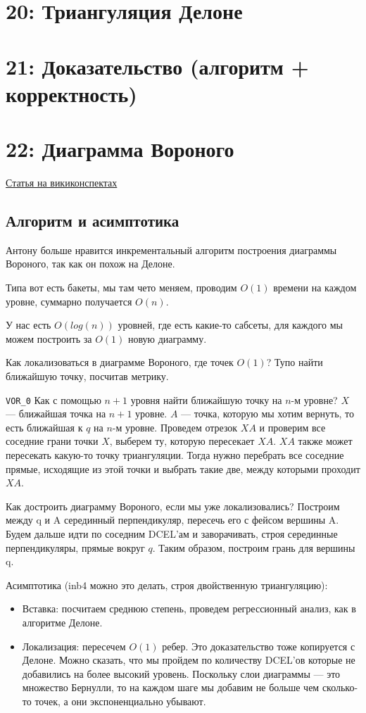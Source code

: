 \documentclass[11pt]{article}
\begin{document}
\section{{\bfseries{}} 20: Триангуляция Делоне}
\label{sec-22}
\section{{\bfseries{}} 21: Доказательство (алгоритм + корректность)}
\label{sec-23}
\section{{\bfseries{}} 22: Диаграмма Вороного}
\label{sec-24}
\href{http://neerc.ifmo.ru/wiki/index.php?title=Диаграмма_Вороного}{Статья на викиконспектах}
\subsection{Алгоритм и асимптотика}
\label{sec-24-1}
Антону больше нравится инкрементальный алгоритм построения диаграммы
Вороного, так как он похож на Делоне.

Типа вот есть бакеты, мы там чето меняем, проводим $O(1)$ времени на
каждом уровне, суммарно получается $O(n)$.

У нас есть $O(log(n))$ уровней, где есть какие-то сабсеты, для
каждого мы можем построить за $O(1)$ новую диаграмму.

Как локализоваться в диаграмме Вороного, где точек $O(1)$? Тупо
найти ближайшую точку, посчитав метрику.

\verb~VOR_0~
Как с помощью $n+1$ уровня найти ближайшую точку на $n$-м уровне?
$X$ --- ближайшая точка на $n+1$ уровне. $A$ --- точка, которую мы хотим
вернуть, то есть ближайшая к $q$ на $n$-м уровне. Проведем отрезок $XA$ и
проверим все соседние грани точки $X$, выберем ту, которую пересекает
$XA$. $XA$ также может пересекать какую-то точку триангуляции. Тогда
нужно перебрать все соседние прямые, исходящие из этой точки и
выбрать такие две, между которыми проходит $XA$.

Как достроить диаграмму Вороного, если мы уже локализовались?
Построим между q и A серединный перпендикуляр, пересечь его с фейсом
вершины A. Будем дальше идти по соседним DCEL'ам и заворачивать,
строя серединные перпендикуляры, прямые вокруг $q$. Таким образом,
построим грань для вершины q.

Асимптотика (inb4 можно это делать, строя двойственную триангуляцию):
\begin{itemize}
\item Вставка: посчитаем среднюю степень, проведем регрессионный анализ,
как в алгоритме Делоне.
\item Локализация: пересечем $O(1)$ ребер. Это доказательство тоже
копируется с Делоне. Можно сказать, что мы пройдем по количеству
DCEL'ов которые не добавились на более высокий уровень. Поскольку
слои диаграммы --- это множество Бернулли, то на каждом шаге мы
добавим не больше чем сколько-то точек, а они экспоненциально
убывают.
\end{itemize}
\end{document}
